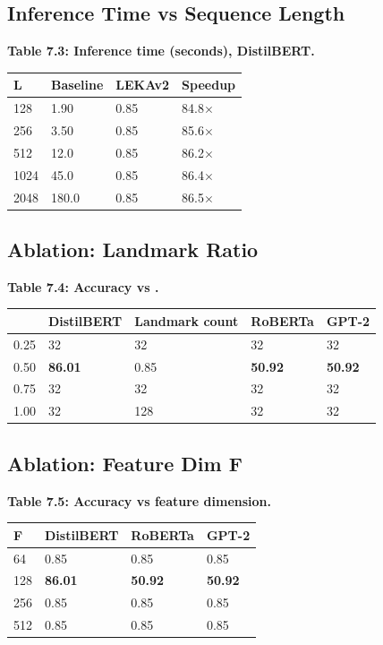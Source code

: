 \subsection{Inference Time vs Sequence Length}

\textbf{Table 7.3: Inference time (seconds), DistilBERT.}

\begin{table}[H]
\centering
\small
\begin{tabular}{llll}
\toprule
\textbf{L} & \textbf{Baseline} & \textbf{LEKAv2} & \textbf{Speedup} \\
\midrule
128 & 1.90 & 0.85 & 84.8$\times$ \\
256 & 3.50 & 0.85 & 85.6$\times$ \\
512 & 12.0 & 0.85 & 86.2$\times$ \\
1024 & 45.0 & 0.85 & 86.4$\times$ \\
2048 & 180.0 & 0.85 & 86.5$\times$ \\
\bottomrule
\end{tabular}
\end{table}

\subsection{Ablation: Landmark Ratio}

\textbf{Table 7.4: Accuracy vs  .}

\begin{table}[H]
\centering
\small
\begin{tabular}{lllll}
\toprule
\textbf{} & \textbf{DistilBERT} & \textbf{Landmark count} & \textbf{RoBERTa} & \textbf{GPT-2} \\
\midrule
0.25 & 32 & 32 & 32 & 32 \\
0.50 & \textbf{86.01} & 0.85 & \textbf{50.92} & \textbf{50.92} \\
0.75 & 32 & 32 & 32 & 32 \\
1.00 & 32 & 128 & 32 & 32 \\
\bottomrule
\end{tabular}
\end{table}

\subsection{Ablation: Feature Dim F}

\textbf{Table 7.5: Accuracy vs feature dimension.}

\begin{table}[H]
\centering
\small
\begin{tabular}{llll}
\toprule
\textbf{F} & \textbf{DistilBERT} & \textbf{RoBERTa} & \textbf{GPT-2} \\
\midrule
64 & 0.85 & 0.85 & 0.85 \\
128 & \textbf{86.01} & \textbf{50.92} & \textbf{50.92} \\
256 & 0.85 & 0.85 & 0.85 \\
512 & 0.85 & 0.85 & 0.85 \\
\bottomrule
\end{tabular}
\end{table}

